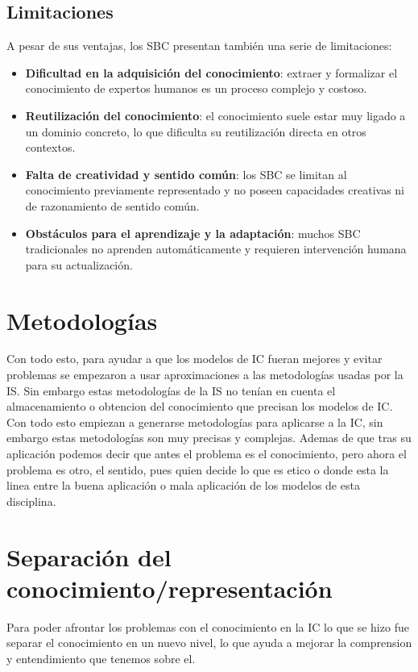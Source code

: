 \documentclass{article}
\begin{document}
    \subsection{Limitaciones}
    
    A pesar de sus ventajas, los SBC presentan también una serie de limitaciones:
    
    \begin{itemize}
        \item \textbf{Dificultad en la adquisición del conocimiento}: extraer y formalizar el conocimiento de expertos humanos es un proceso complejo y costoso.
        \item \textbf{Reutilización del conocimiento}: el conocimiento suele estar muy ligado a un dominio concreto, lo que dificulta su reutilización directa en otros contextos.
        \item \textbf{Falta de creatividad y sentido común}: los SBC se limitan al conocimiento previamente representado y no poseen capacidades creativas ni de razonamiento de sentido común.
        \item \textbf{Obstáculos para el aprendizaje y la adaptación}: muchos SBC tradicionales no aprenden automáticamente y requieren intervención humana para su actualización.
    \end{itemize}


\section{Metodologías}
    Con todo esto, para ayudar a que los modelos de IC fueran mejores y evitar problemas se empezaron a usar aproximaciones a las metodologías usadas por la IS. Sin embargo estas metodologías de la IS no tenían en cuenta el almacenamiento o obtencion del conocimiento que precisan los modelos de IC. \\

    Con todo esto empiezan a generarse metodologías para aplicarse a la IC, sin embargo estas metodologías son muy precisas y complejas. Ademas de que tras su aplicación podemos decir que antes el problema es el conocimiento, pero ahora el problema es otro, el sentido, pues quien decide lo que es etico o donde esta la linea entre la buena aplicación o mala aplicación de los modelos de esta disciplina.

\section{Separación del conocimiento/representación}
    Para poder afrontar los problemas con el conocimiento en la IC lo que se hizo fue separar el conocimiento en un nuevo nivel, lo que ayuda a mejorar la comprension y entendimiento que tenemos sobre el. \\
\end{document}
